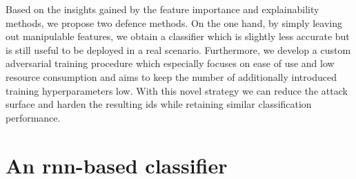 \documentclass[conference]{IEEEtran}
\begin{document}
Based on the insights gained by the feature importance and explainability methods, we propose two defence methods.
On the one hand, by simply leaving out manipulable features, we obtain a classifier which is slightly less accurate but is still useful to be deployed in a real scenario. Furthermore, we develop a custom adversarial training procedure which especially focuses on ease of use and low resource consumption and aims to keep the number of additionally introduced training hyperparameters low. With this novel strategy we can reduce the attack surface and harden the resulting \gls{ids} while retaining similar classification performance. %

\section{An \gls{rnn}-based classifier}
\end{document}

